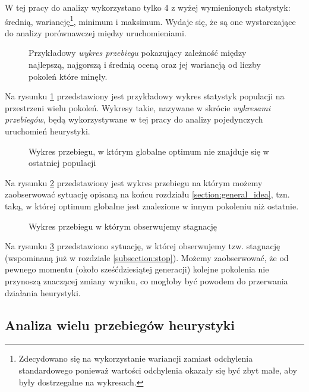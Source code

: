 \documentclass[./FM_mgr.tex]{subfiles}
\begin{document}
W tej pracy do analizy wykorzystano tylko 4 z wyżej wymienionych statystyk: średnią, wariancję\footnote{Zdecydowano się na wykorzystanie wariancji zamiast odchylenia standardowego ponieważ wartości odchylenia okazały się być zbyt małe, aby były dostrzegalne na wykresach.}, minimum i maksimum. Wydaje się, że są one wystarczające do analizy porównawczej między uruchomieniami. 


\begin{figure}[H]
	\caption{Przykładowy \emph{wykres przebiegu} pokazujący zależność między  najlepszą, najgorszą i średnią oceną oraz jej wariancją od liczby pokoleń które minęły. \label{plot:random_example}}
	\centering
\end{figure}

Na rysunku \ref{plot:random_example} przedstawiony jest przykładowy wykres statystyk populacji na przestrzeni wielu pokoleń. Wykresy takie, nazywane w skrócie \emph{wykresami przebiegów}, będą wykorzystywane w tej pracy do analizy pojedynczych uruchomień heurystyki. 

\begin{figure}[H]
	\caption{Wykres przebiegu, w którym globalne optimum nie znajduje się w ostatniej populacji \label{plot:mid_opt}}
	\centering
\end{figure}

Na rysunku \ref{plot:mid_opt} przedstawiony jest wykres przebiegu na którym możemy zaobserwować sytuację opisaną na końcu rozdziału \ref{section:general_idea}, tzn. taką, w której optimum globalne jest znalezione w innym pokoleniu niż ostatnie.

\begin{figure}[H]
	\caption{Wykres przebiegu w którym obserwujemy stagnację \label{plot:stagnation}}
	\centering
\end{figure}

Na rysunku \ref{plot:stagnation} przedstawiono sytuację, w której obserwujemy tzw. stagnację (wspominaną już w rozdziale \ref{subsection:stop}). Możemy zaobserwować, że od pewnego momentu (około sześćdziesiątej generacji) kolejne pokolenia nie przynoszą znaczącej zmiany wyniku, co mogłoby być powodem do przerwania działania heurystyki.

\subsection{Analiza wielu przebiegów heurystyki}
\end{document}
